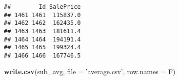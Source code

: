 \documentclass[]{article}
\newenvironment{Shaded}{\begin{snugshade}}{\end{snugshade}}
\newcommand{\KeywordTok}[1]{\textcolor[rgb]{0.13,0.29,0.53}{\textbf{#1}}}
\newcommand{\DataTypeTok}[1]{\textcolor[rgb]{0.13,0.29,0.53}{#1}}
\newcommand{\StringTok}[1]{\textcolor[rgb]{0.31,0.60,0.02}{#1}}
\newcommand{\NormalTok}[1]{#1}
\begin{document}
\begin{verbatim}
##        Id SalePrice
## 1461 1461  115837.0
## 1462 1462  162435.0
## 1463 1463  181611.4
## 1464 1464  194191.4
## 1465 1465  199324.4
## 1466 1466  167746.5
\end{verbatim}

\begin{Shaded}
\begin{Highlighting}[]
\KeywordTok{write.csv}\NormalTok{(sub_avg, }\DataTypeTok{file =} \StringTok{'average.csv'}\NormalTok{, }\DataTypeTok{row.names =}\NormalTok{ F)}
\end{Highlighting}
\end{Shaded}
\end{document}
